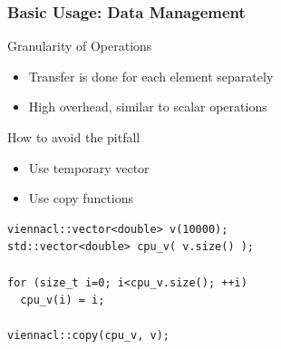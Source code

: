 % 
% 
% 


\begin{frame}[fragile]
\frametitle{Basic Usage: Data Management}
\begin{block}{Granularity of Operations}
 \begin{itemize}
  \item Transfer is done for each element separately
  \item High overhead, similar to scalar operations
 \end{itemize}
\end{block}

\begin{block}{How to avoid the pitfall}
 \begin{itemize}
  \item Use temporary vector
  \item Use copy functions
 \end{itemize}
   \begin{lstlisting}
viennacl::vector<double> v(10000);
std::vector<double> cpu_v( v.size() );

for (size_t i=0; i<cpu_v.size(); ++i)
  cpu_v(i) = i; 

viennacl::copy(cpu_v, v);
   \end{lstlisting}
\end{block}
\end{frame}



